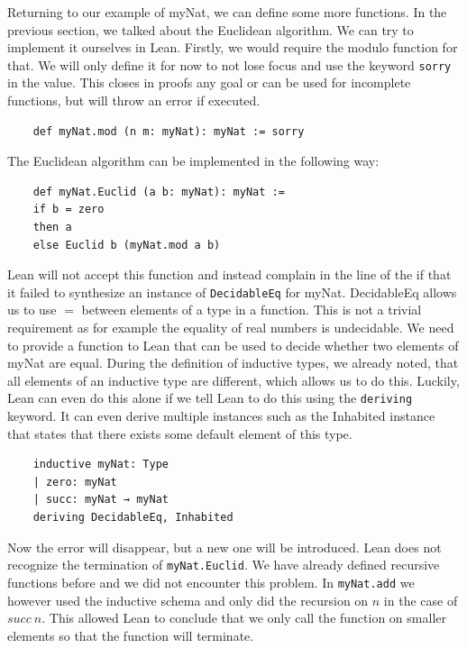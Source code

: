 Returning to our example of myNat, we can define some more functions. In the previous section, we talked about the Euclidean algorithm. We can try to implement it ourselves in Lean. Firstly, we would require the modulo function for that. We will only define it for now to not lose focus and use the keyword \lstinline|sorry| in the value. This closes in proofs any goal or can be used for incomplete functions, but will throw an error if executed.

\begin{lstlisting}
    def myNat.mod (n m: myNat): myNat := sorry
\end{lstlisting}

The Euclidean algorithm can be implemented in the following way:

\begin{lstlisting}
    def myNat.Euclid (a b: myNat): myNat :=
    if b = zero
    then a
    else Euclid b (myNat.mod a b)
\end{lstlisting}

Lean will not accept this function and instead complain in the line of the if that it failed to synthesize an instance of \lstinline|DecidableEq| for myNat. DecidableEq allows us to use $=$ between elements of a type in a function. This is not a trivial requirement as for example the equality of real numbers is undecidable\cite{EqualityRealNumber}. We need to provide a function to Lean that can be used to decide whether two elements of myNat are equal. During the definition of inductive types, we already noted, that all elements of an inductive type are different, which allows us to do this. Luckily, Lean can even do this alone if we tell Lean to do this using the \lstinline|deriving| keyword. It can even derive multiple instances such as the Inhabited instance that states that there exists some default element of this type.

\begin{lstlisting}
    inductive myNat: Type
    | zero: myNat
    | succ: myNat → myNat
    deriving DecidableEq, Inhabited

\end{lstlisting}

Now the error will disappear, but a new one will be introduced. Lean does not recognize the termination of \lstinline|myNat.Euclid|. We have already defined recursive functions before and we did not encounter this problem. In \lstinline|myNat.add| we however used the inductive schema and only did the recursion on $n$ in the case of $succ\ n$. This allowed Lean to conclude that we only call the function on smaller elements so that the function will terminate.

